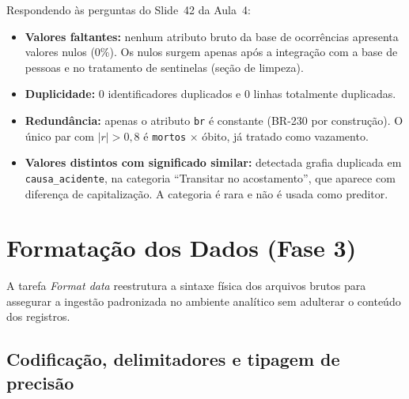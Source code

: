 \documentclass[11pt,a4paper]{article}
\begin{document}
Respondendo às perguntas do Slide~42 da Aula~4:
\begin{itemize}
  \item \textbf{Valores faltantes:} nenhum atributo bruto da base de ocorrências apresenta valores nulos (0\%). Os nulos surgem apenas após a integração com a base de pessoas e no tratamento de sentinelas (seção de limpeza).
  \item \textbf{Duplicidade:} 0 identificadores duplicados e 0 linhas totalmente duplicadas.
  \item \textbf{Redundância:} apenas o atributo \texttt{br} é constante (BR-230 por construção). O único par com $|r|>0,8$ é \texttt{mortos} $\times$ óbito, já tratado como vazamento.
  \item \textbf{Valores distintos com significado similar:} detectada grafia duplicada em \texttt{causa\_acidente}, na categoria ``Transitar no acostamento'', que aparece com diferença de capitalização. A categoria é rara e não é usada como preditor.
\end{itemize}

\section{Formatação dos Dados (Fase 3)}

A tarefa \textit{Format data} reestrutura a sintaxe física dos arquivos brutos para assegurar a ingestão padronizada no ambiente analítico sem adulterar o conteúdo dos registros.

\subsection{Codificação, delimitadores e tipagem de precisão}
\end{document}
